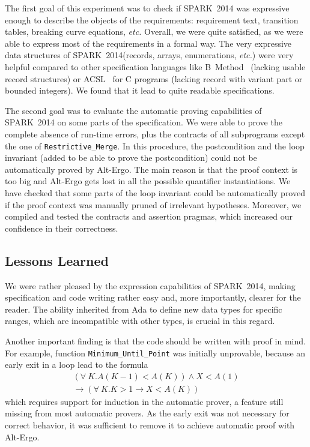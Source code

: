 \documentclass[10pt,a4paper,twocolumn]{article}
\newcommand{\newspark}{SPARK~2014\xspace}
\newcommand{\altergo}{Alt-Ergo\xspace}
\newcommand{\etc}{\textit{etc.}\xspace}
\begin{document}
The first goal of this experiment was to check if \newspark was
expressive enough to describe the objects of the requirements:
requirement text, transition tables, breaking curve equations, \etc
Overall, we were quite satisfied, as we were able to express most of
the requirements in a formal way. The very expressive data structures
of \newspark (records, arrays, enumerations, \etc) were very helpful
compared to other specification languages like B~Method~\cite{b-book}
(lacking usable record structures) or ACSL~\cite{acsl} for C programs
(lacking record with variant part or bounded integers).  We found that
it lead to quite readable specifications.

The second goal was to evaluate the automatic proving capabilities of
\newspark on some parts of the specification. We were able to prove
the complete absence of run-time errors, plus the contracts of all
subprograms except the one of \verb|Restrictive_Merge|. In this
procedure, the postcondition and the loop invariant (added to be able
to prove the postcondition) could not be automatically proved by
\altergo. The main reason is that the proof context is too big and
\altergo gets lost in all the possible quantifier instantiations. We
have checked that some parts of the loop invariant could be
automatically proved if the proof context was manually pruned of
irrelevant hypotheses. Moreover, we compiled and tested the contracts
and assertion pragmas, which increased our confidence in their
correctness.

\subsection{Lessons Learned}

We were rather pleased by the expression capabilities of \newspark,
making specification and code writing rather easy and, more
importantly, clearer for the reader. The ability inherited from Ada to
define new data types for specific ranges, which are incompatible with
other types, is crucial in this regard.

Another important finding is that the code should be written with
proof in mind. For example, function \verb|Minimum_Until_Point| was
initially unprovable, because an early exit in a loop lead to the
formula {\footnotesize
\begin{multline*}
(\forall~K. A(K-1)<A(K)) \wedge X<A(1) \\
\rightarrow (\forall~K. K>1 \rightarrow X<A(K))
\end{multline*}
}
which requires support for induction in the automatic prover, a
feature still missing from most automatic provers. As the early exit
was not necessary for correct behavior, it was sufficient to remove it
to achieve automatic proof with \altergo.
\end{document}
